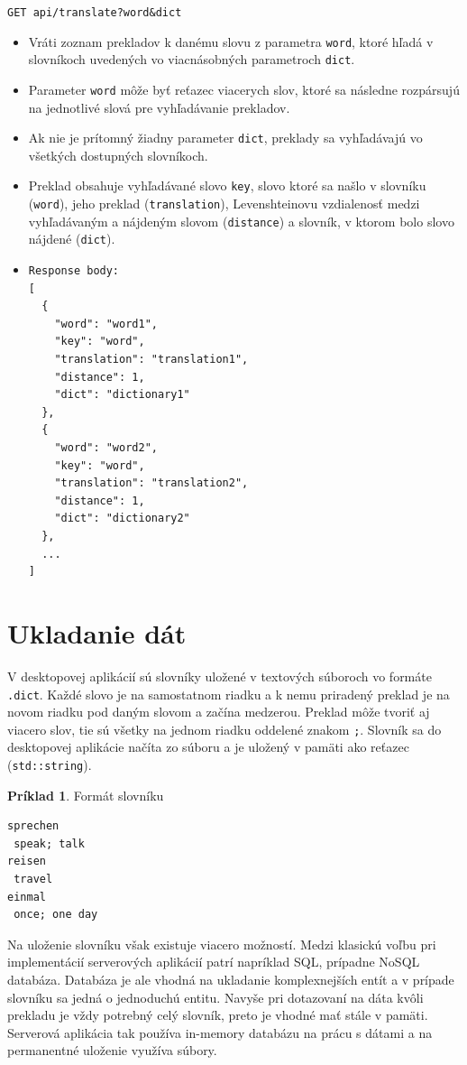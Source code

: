 \documentclass[
  digital, %
  table,   %
  lof,     %
  lot,     %
]{fithesis3}
\begin{document}
\noindent
\texttt{GET api/translate?word\&dict}
\begin{itemize}
\item Vráti zoznam prekladov k danému slovu z parametra \texttt{word}, ktoré hľadá v slovníkoch uvedených vo viacnásobných parametroch \texttt{dict}.
\item Parameter \texttt{word} môže byť reťazec viacerych slov, ktoré sa následne rozpársujú na jednotlivé slová pre vyhľadávanie prekladov.
\item Ak nie je prítomný žiadny parameter \texttt{dict}, preklady sa vyhľadávajú vo všetkých dostupných slovníkoch.
\item Preklad obsahuje vyhľadávané slovo \texttt{key}, slovo ktoré sa našlo v slovníku (\texttt{word}), jeho preklad (\texttt{translation}), Levenshteinovu vzdialenosť medzi vyhľadávaným a nájdeným slovom (\texttt{distance}) a slovník, v ktorom bolo slovo nájdené (\texttt{dict}).
\item \begin{lstlisting}[basicstyle=\small]
Response body:
[
  {
    "word": "word1",
    "key": "word",
    "translation": "translation1",
    "distance": 1,
    "dict": "dictionary1"
  },
  {
    "word": "word2",
    "key": "word",
    "translation": "translation2",
    "distance": 1,
    "dict": "dictionary2"
  },
  ...
]
\end{lstlisting}
\end{itemize}


\section{Ukladanie dát}
V desktopovej aplikácií sú slovníky uložené v textových súboroch vo formáte \texttt{.dict}. Každé slovo je na samostatnom riadku a k nemu priradený preklad je na novom riadku pod daným slovom a začína medzerou. Preklad môže tvoriť aj viacero slov, tie sú všetky na jednom riadku oddelené znakom \texttt{;}. Slovník sa do desktopovej aplikácie načíta zo súboru a je uložený v pamäti ako reťazec (\texttt{std::string}).

\theoremstyle{definition}
\newtheorem{exmp}{Príklad}[chapter]
\begin{exmp}
Formát slovníku
\centering
\begin{lstlisting}[basicstyle=\small]
sprechen
 speak; talk
reisen
 travel
einmal
 once; one day
\end{lstlisting}
\end{exmp}

Na uloženie slovníku však existuje viacero možností. Medzi klasickú voľbu pri implementácií serverových aplikácií patrí napríklad SQL, prípadne NoSQL databáza. Databáza je ale vhodná na ukladanie komplexnejších entít a v prípade slovníku sa jedná o jednoduchú entitu. Navyše pri dotazovaní na dáta kvôli prekladu je vždy potrebný celý slovník, preto je vhodné mať stále v pamäti. Serverová aplikácia tak používa in-memory databázu na prácu s dátami a na permanentné uloženie využíva súbory.
\end{document}
